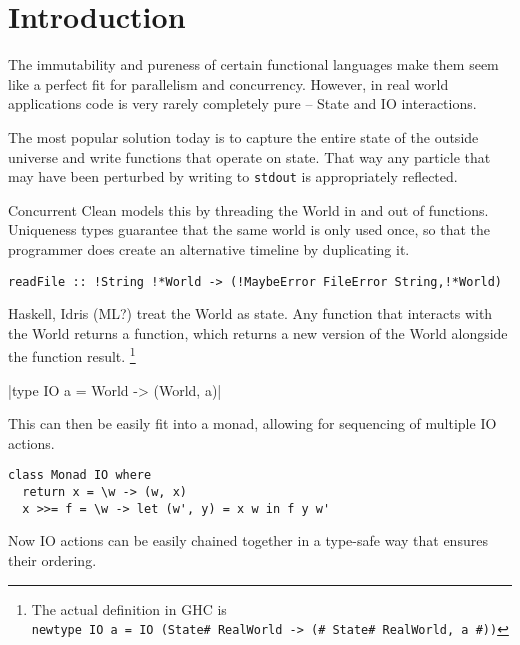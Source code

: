 \documentclass{report}
\begin{document}
\newcommand{\llbracket}{[\![}
\newcommand{\rrbracket}{]\!]}
\newcommand{\IO}{\mathsf{IO}}
\newcommand{\bind}{>\!\!>\!\!=} \newcommand{\concbind}{>\!\!>\!>\!\!=}
\newcommand{\subtyp}{\geq:}
\newcommand{\notsubtyp}{\ngeq:}
\newcommand{\lift}[1]{\ensuremath{\llbracket#1\rrbracket}}
\newcommand{\use}[2]{\ensuremath{\llbracket#2\rrbracket_{#1}}}


\chapter{Introduction}
The immutability and pureness of certain functional languages make them seem
like a perfect fit for parallelism and concurrency.
However, in real world applications code is very rarely completely pure -- State
and IO interactions.

The most popular solution today is to capture the entire state of the outside
universe and write functions that operate on state. That way any particle that
may have been perturbed by writing to \texttt{stdout} is appropriately reflected.

Concurrent Clean models this by threading the World in and out of
functions. Uniqueness types guarantee that the same world is only used once, so
that the programmer does create an alternative timeline by duplicating it.

\begin{verbatim}
readFile :: !String !*World -> (!MaybeError FileError String,!*World)
\end{verbatim}

Haskell, Idris (ML?) treat the World as state. Any function that interacts with
the World returns a function, which returns a new version of the World alongside
the function result.
\footnote{The actual definition in GHC is \\ \texttt{newtype IO a = IO (State# RealWorld -> (# State# RealWorld, a #))}}

|type IO a = World -> (World, a)|

This can then be easily fit into a monad, allowing for sequencing of multiple IO
actions.

\begin{verbatim}
class Monad IO where
  return x = \w -> (w, x)
  x >>= f = \w -> let (w', y) = x w in f y w'
\end{verbatim}

Now IO actions can be easily chained together in a type-safe way that ensures
their ordering.
\end{document}
